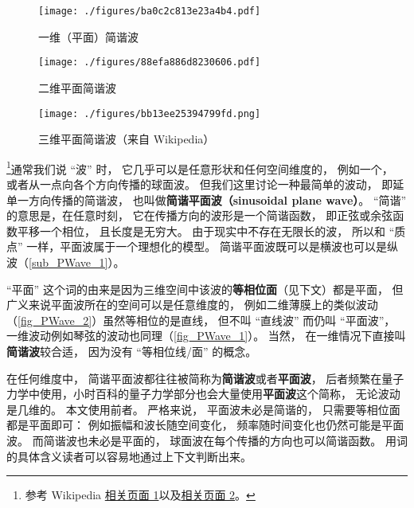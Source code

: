 
\begin{figure}[ht]
\centering
\texttt{[image: ./figures/ba0c2c813e23a4b4.pdf]}
\caption{一维（平面）简谐波} \label{fig_PWave_1}
\end{figure}

\begin{figure}[ht]
\centering
\texttt{[image: ./figures/88efa886d8230606.pdf]}
\caption{二维平面简谐波} \label{fig_PWave_2}
\end{figure}

\begin{figure}[ht]
\centering
\texttt{[image: ./figures/bb13ee25394799fd.png]}
\caption{三维平面简谐波（来自 Wikipedia）} \label{fig_PWave_3}
\end{figure}


\footnote{参考 Wikipedia \href{https://en.wikipedia.org/wiki/Plane_wave}{相关页面 1}以及\href{https://en.wikipedia.org/wiki/Sinusoidal_plane_wave}{相关页面 2}。}通常我们说 “波” 时， 它几乎可以是任意形状和任何空间维度的， 例如一个， 或者从一点向各个方向传播的球面波。 但我们这里讨论一种最简单的波动， 即延单一方向传播的简谐波， 也叫做\textbf{简谐平面波（sinusoidal plane wave）}。 “简谐” 的意思是，在任意时刻， 它在传播方向的波形是一个简谐函数， 即正弦或余弦函数平移一个相位， 且长度是无穷大。 由于现实中不存在无限长的波， 所以和 “质点” 一样，平面波属于一个理想化的模型。 简谐平面波既可以是横波也可以是纵波（\autoref{sub_PWave_1}）。

“平面” 这个词的由来是因为三维空间中该波的\textbf{等相位面}（见下文）都是平面， 但广义来说平面波所在的空间可以是任意维度的， 例如二维薄膜上的类似波动（\autoref{fig_PWave_2}）虽然等相位的是直线， 但不叫 “直线波” 而仍叫 “平面波”， 一维波动例如琴弦的波动也同理（\autoref{fig_PWave_1}）。 当然， 在一维情况下直接叫\textbf{简谐波}较合适， 因为没有 “等相位线/面” 的概念。

在任何维度中， 简谐平面波都往往被简称为\textbf{简谐波}或者\textbf{平面波}， 后者频繁在量子力学中使用，小时百科的量子力学部分也会大量使用\textbf{平面波}这个简称， 无论波动是几维的。 本文使用前者。 严格来说， 平面波未必是简谐的， 只需要等相位面都是平面即可： 例如振幅和波长随空间变化， 频率随时间变化也仍然可能是平面波。 而简谐波也未必是平面的， 球面波在每个传播的方向也可以简谐函数。 用词的具体含义读者可以容易地通过上下文判断出来。


